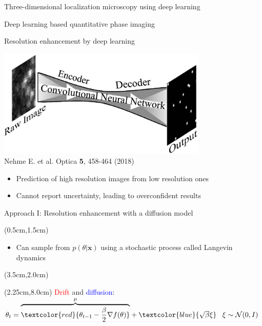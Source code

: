 \documentclass{beamer}					%
\begin{document}
\begin{frame}{Three-dimensional localization microscopy using deep learning}

\end{frame}

\begin{frame}{Deep learning based quantitative phase imaging}

\end{frame}

\begin{frame}{Resolution enhancement by deep learning}
\begin{center}
\includegraphics[width=10cm]{../../postdoc/sartorius/media/Deep-STORM.jpeg}
\\Nehme E. et al. Optica \textbf{5}, 458-464 (2018)
\vspace{0.5cm}
\begin{itemize}
\item Prediction of high resolution images from low resolution ones
\item Cannot report uncertainty, leading to overconfident results
\end{itemize}
\end{center}
\end{frame}

\begin{frame}{Approach I: Resolution enhancement with a diffusion model}
\begin{textblock*}{13cm}(0.5cm,1.5cm)
\begin{itemize}
\item Can sample from $p(\theta\lvert \boldsymbol{x})$ using a stochastic process called Langevin dynamics
\end{itemize}
\end{textblock*}
\begin{textblock*}{8cm}(3.5cm,2.0cm)
\end{textblock*}
\begin{textblock*}{14cm}(2.25cm,8.0cm)
\textcolor{red}{Drift} and \textcolor{blue}{diffusion}: 
$\theta_{t} = 
\overset{\mu}{\overbrace{\textcolor{red}{\theta_{t-1} - \frac{\beta}{2}\nabla f(\theta)}}} 
+ \textcolor{blue}{\sqrt{\beta}\xi} 
\;\;\; \xi \sim \mathcal{N}(0,I)$
\end{textblock*}
\end{frame}
\end{document}
